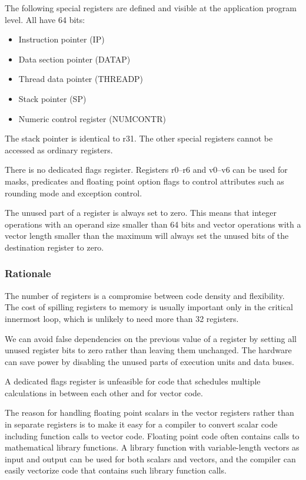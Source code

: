\documentclass[forwardcom.tex]{subfiles}
\begin{document}
The following special registers are defined and visible at the application program level. All have 64 bits:

\begin{itemize}
\item Instruction pointer (IP)
\item Data section pointer (DATAP)
\item Thread data pointer (THREADP)
\item Stack pointer (SP)
\item Numeric control register (NUMCONTR)
\end{itemize}

The stack pointer is identical to r31. The other special registers cannot be accessed as ordinary registers.
\vspace{2mm}

There is no dedicated flags register. Registers r0--r6 and v0--v6 can be used for masks, predicates and floating point option flags to control attributes such as rounding mode and exception control.
\vspace{2mm}

The unused part of a register is always set to zero. This means that integer operations with an operand size smaller than 64 bits and vector operations with a vector length smaller than the maximum will always set the unused bits of the destination register to zero.

\subsubsection{Rationale}
The number of registers is a compromise between code density and flexibility. The cost of spilling registers to memory is usually important only in the critical innermost loop, which is unlikely to need more than 32 registers.
\vspace{2mm}

We can avoid false dependencies on the previous value of a register by setting all unused register bits to zero rather than leaving them unchanged. The hardware can save power by disabling the unused parts of execution units and data buses.
\vspace{2mm}

A dedicated flags register is unfeasible for code that schedules multiple calculations in between each other and for vector code.
\vspace{2mm}

The reason for handling floating point scalars in the vector registers rather than in separate registers is to make it easy for a compiler to convert scalar code including function calls to vector code. Floating point code often contains calls to mathematical library functions. 
A library function with variable-length vectors as input and output can be used for both scalars and vectors, and the compiler can easily vectorize code that contains such library function calls.
\end{document}
